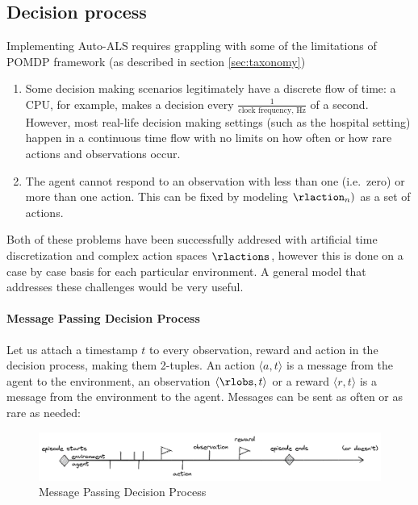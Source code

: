 \newpage
\subsection{Decision process}
\label{sec:mpdp}

Implementing Auto-ALS requires grappling with some of the limitations of POMDP framework (as described in section \ref{sec:taxonomy})
\begin{enumerate}
    \item Some decision making scenarios legitimately have a discrete flow of time: a CPU, for example, makes a decision every $\frac{1}{\text{clock frequency, Hz}}$ of a second. However, most real-life decision making settings (such as the hospital setting) happen in a continuous time flow with no limits on how often or how rare actions and observations occur.
    \item The agent cannot respond to an observation with less than one (i.e.~zero) or more than one action. This can be fixed by modeling $\rlaction_n)$ as a set of actions.
\end{enumerate}

Both of these problems have been successfully addresed with artificial time discretization and complex action spaces $\rlactions$, however this is done on a case by case basis for each particular environment. A general model that addresses these challenges would be very useful.

\paragraph{Message Passing Decision Process}

Let us attach a timestamp $t$ to every observation, reward and action in the decision process, making them 2-tuples. An action $\langle a, t\rangle$ is a message from the agent to the environment, an observation $\langle \rlobs, t \rangle$ or a reward $\langle r, t \rangle$ is a message from the environment
to the agent. Messages can be sent as often or as rare as needed:

\begin{figure}
\centering
\includegraphics[width=\linewidth]{images/mpdp.png}
\caption{Message Passing Decision Process}
\end{figure}

